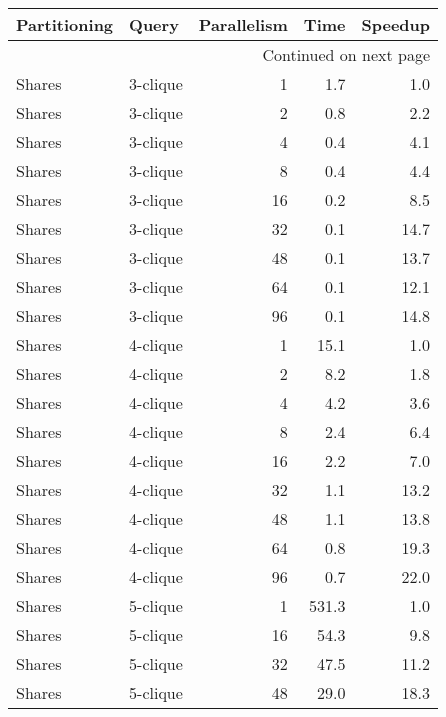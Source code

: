 \begin{longtable}{llr|rr}
\toprule
  Partitioning &     Query &  Parallelism &   Time &  Speedup \\
\midrule
\endhead
\midrule
\multicolumn{5}{r}{{Continued on next page}} \\
\midrule
\endfoot

\bottomrule
\endlastfoot
        Shares &  3-clique &            1 &    1.7 &      1.0 \\
        Shares &  3-clique &            2 &    0.8 &      2.2 \\
        Shares &  3-clique &            4 &    0.4 &      4.1 \\
        Shares &  3-clique &            8 &    0.4 &      4.4 \\
        Shares &  3-clique &           16 &    0.2 &      8.5 \\
        Shares &  3-clique &           32 &    0.1 &     14.7 \\
        Shares &  3-clique &           48 &    0.1 &     13.7 \\
        Shares &  3-clique &           64 &    0.1 &     12.1 \\
        Shares &  3-clique &           96 &    0.1 &     14.8 \\
        Shares &  4-clique &            1 &   15.1 &      1.0 \\
        Shares &  4-clique &            2 &    8.2 &      1.8 \\
        Shares &  4-clique &            4 &    4.2 &      3.6 \\
        Shares &  4-clique &            8 &    2.4 &      6.4 \\
        Shares &  4-clique &           16 &    2.2 &      7.0 \\
        Shares &  4-clique &           32 &    1.1 &     13.2 \\
        Shares &  4-clique &           48 &    1.1 &     13.8 \\
        Shares &  4-clique &           64 &    0.8 &     19.3 \\
        Shares &  4-clique &           96 &    0.7 &     22.0 \\
        Shares &  5-clique &            1 &  531.3 &      1.0 \\
        Shares &  5-clique &           16 &   54.3 &      9.8 \\
        Shares &  5-clique &           32 &   47.5 &     11.2 \\
        Shares &  5-clique &           48 &   29.0 &     18.3 \\

\end{longtable}
